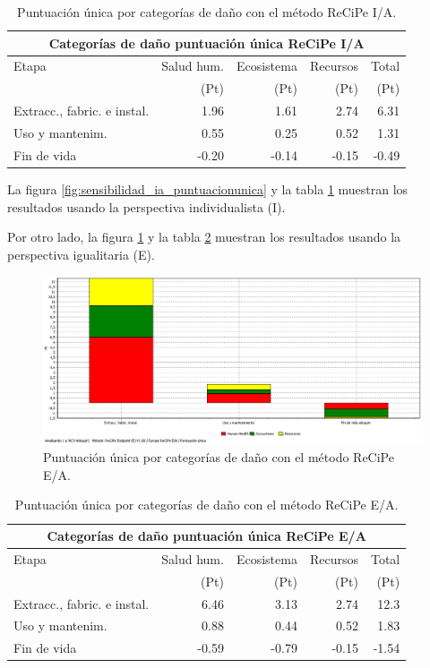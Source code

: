 \begin{table}[!htb]
\centering
\begin{tabular}{p{6cm}rrrr}
\toprule
\multicolumn{5}{c}{Categorías de daño puntuación única ReCiPe I/A}\\
\midrule
Etapa & Salud hum. & Ecosistema & Recursos & Total\\
 & (Pt) & (Pt) & (Pt) & (Pt)\\
\midrule
Extracc., fabric. e instal. & 1.96 & 1.61 & 2.74 & 6.31\\
Uso y mantenim. & 0.55 & 0.25 & 0.52 & 1.31\\
Fin de vida & -0.20 & -0.14 & -0.15 & -0.49\\
\bottomrule
\end{tabular}
\caption{Puntuación única por categorías de daño con el método ReCiPe I/A.}
\label{sensibilidad_ia_puntuacionunica}
\end{table}

La figura \ref{fig:sensibilidad_ia_puntuacionunica} y la tabla \ref{sensibilidad_ia_puntuacionunica} muestran los resultados usando la perspectiva individualista (I).

Por otro lado, la figura \ref{fig:sensibilidad_ea_puntuacionunica} y la tabla \ref{sensibilidad_ea_puntuacionunica} muestran los resultados usando la perspectiva igualitaria (E).

\begin{figure}[!htb]
\centering
\includegraphics[width=15cm]{img/sensibilidad_ea_puntuacionunica.png}
\caption{Puntuación única por categorías de daño con el método ReCiPe E/A.}
\label{fig:sensibilidad_ea_puntuacionunica}
\end{figure}

\begin{table}[!htb]
\centering
\begin{tabular}{p{6cm}rrrr}
\toprule
\multicolumn{5}{c}{Categorías de daño puntuación única ReCiPe E/A}\\
\midrule
Etapa & Salud hum. & Ecosistema & Recursos & Total\\
 & (Pt) & (Pt) & (Pt) & (Pt)\\
\midrule
Extracc., fabric. e instal. & 6.46 & 3.13 & 2.74 & 12.3\\
Uso y mantenim. & 0.88 & 0.44 & 0.52 & 1.83\\
Fin de vida & -0.59 & -0.79 & -0.15 & -1.54\\
\bottomrule
\end{tabular}
\caption{Puntuación única por categorías de daño con el método ReCiPe E/A.}
\label{sensibilidad_ea_puntuacionunica}
\end{table}

